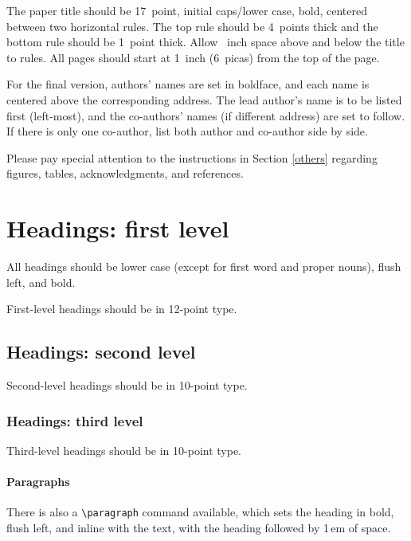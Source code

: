 \documentclass{article}
\begin{document}
The paper title should be 17~point, initial caps/lower case, bold, centered
between two horizontal rules. The top rule should be 4~points thick and the
bottom rule should be 1~point thick. Allow ~inch space above and
below the title to rules. All pages should start at 1~inch (6~picas) from the
top of the page.


For the final version, authors' names are set in boldface, and each name is
centered above the corresponding address. The lead author's name is to be listed
first (left-most), and the co-authors' names (if different address) are set to
follow. If there is only one co-author, list both author and co-author side by
side.


Please pay special attention to the instructions in Section \ref{others}
regarding figures, tables, acknowledgments, and references.

\section{Headings: first level}
\label{headings}


All headings should be lower case (except for first word and proper nouns),
flush left, and bold.


First-level headings should be in 12-point type.


\subsection{Headings: second level}


Second-level headings should be in 10-point type.


\subsubsection{Headings: third level}


Third-level headings should be in 10-point type.


\paragraph{Paragraphs}


There is also a \verb+\paragraph+ command available, which sets the heading in
bold, flush left, and inline with the text, with the heading followed by 1\,em
of space.
\end{document}
